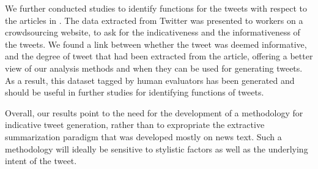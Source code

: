 We further conducted studies to identify functions for the tweets with respect to the articles in . The data extracted from Twitter was presented to workers on a crowdsourcing website, to ask for the indicativeness and the informativeness of the tweets. We found a link between whether the tweet was deemed informative, and the degree of tweet that had been extracted from the article, offering a better view of our analysis methods and when they can be used for generating tweets. As a result, this dataset tagged by human evaluators has been generated and should be useful in further studies for identifying functions of tweets.

Overall, our results point to the need for the development of a methodology for indicative tweet generation, rather than to expropriate the extractive summarization paradigm that was developed mostly on news text. Such a methodology will ideally be sensitive to stylistic factors as well as the underlying intent of the tweet.

